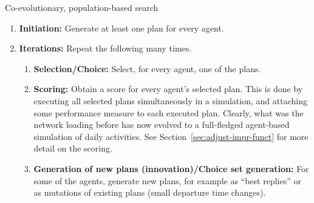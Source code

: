 \begin{algorithm}[H]

\caption{Co-evolutionary, population-based search}

\begin{enumerate}
\item \textbf{Initiation:} Generate at least one plan for every
  agent. 

\item \textbf{Iterations:} Repeat the following many times.

\begin{enumerate}

\item \textbf{Selection/Choice:} Select, for every agent, one of the plans.

\item \textbf{Scoring:} Obtain a score for every agent's selected
  plan.  This is done by executing all selected plans simultaneously
  in a simulation, and attaching some performance measure to each
  executed plan.  Clearly, what was the network loading before has now
  evolved to a full-fledged agent-based simulation of daily
  activities.  See Section~\ref{sec:adjust-impr-funct} for more detail on
  the scoring.

\item \textbf{Generation of new plans (innovation)/Choice set
  generation:} For some of the agents, generate new plans, for
  example as ``best replies'' or as mutations of existing plans
  (\eg small departure time changes).

\end{enumerate} %

\end{enumerate}

\end{algorithm}

% 
% 

